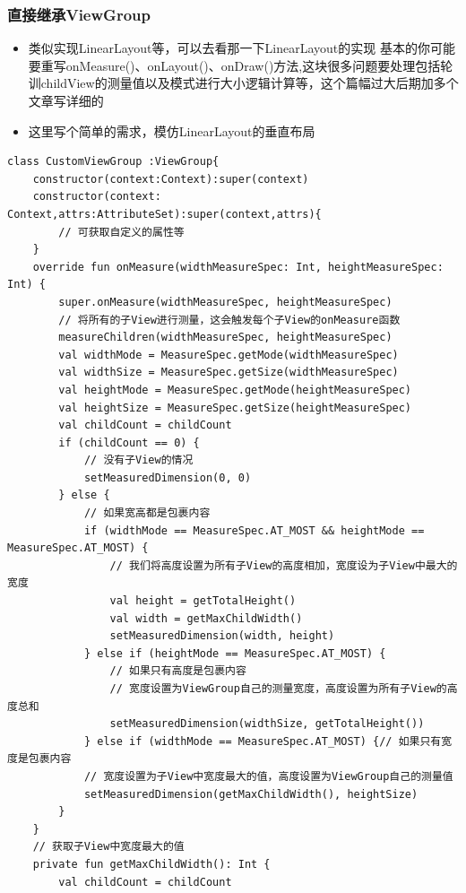 \documentclass[9pt, b5paper]{article}
\begin{document}
\subsubsection{直接继承ViewGroup}
\label{sec-1-3-4}
\begin{itemize}
\item 类似实现LinearLayout等，可以去看那一下LinearLayout的实现 基本的你可能要重写onMeasure()、onLayout()、onDraw()方法,这块很多问题要处理包括轮训childView的测量值以及模式进行大小逻辑计算等，这个篇幅过大后期加多个文章写详细的
\item 这里写个简单的需求，模仿LinearLayout的垂直布局
\end{itemize}
\begin{verbatim}
class CustomViewGroup :ViewGroup{
    constructor(context:Context):super(context)
    constructor(context: Context,attrs:AttributeSet):super(context,attrs){
        // 可获取自定义的属性等
    }
    override fun onMeasure(widthMeasureSpec: Int, heightMeasureSpec: Int) {
        super.onMeasure(widthMeasureSpec, heightMeasureSpec)
        // 将所有的子View进行测量，这会触发每个子View的onMeasure函数
        measureChildren(widthMeasureSpec, heightMeasureSpec)
        val widthMode = MeasureSpec.getMode(widthMeasureSpec)
        val widthSize = MeasureSpec.getSize(widthMeasureSpec)
        val heightMode = MeasureSpec.getMode(heightMeasureSpec)
        val heightSize = MeasureSpec.getSize(heightMeasureSpec)
        val childCount = childCount
        if (childCount == 0) {
            // 没有子View的情况
            setMeasuredDimension(0, 0)
        } else {
            // 如果宽高都是包裹内容
            if (widthMode == MeasureSpec.AT_MOST && heightMode == MeasureSpec.AT_MOST) {
                // 我们将高度设置为所有子View的高度相加，宽度设为子View中最大的宽度
                val height = getTotalHeight()
                val width = getMaxChildWidth()
                setMeasuredDimension(width, height)
            } else if (heightMode == MeasureSpec.AT_MOST) {
                // 如果只有高度是包裹内容
                // 宽度设置为ViewGroup自己的测量宽度，高度设置为所有子View的高度总和
                setMeasuredDimension(widthSize, getTotalHeight())
            } else if (widthMode == MeasureSpec.AT_MOST) {// 如果只有宽度是包裹内容
            // 宽度设置为子View中宽度最大的值，高度设置为ViewGroup自己的测量值
            setMeasuredDimension(getMaxChildWidth(), heightSize)
        }
    }
    // 获取子View中宽度最大的值
    private fun getMaxChildWidth(): Int {
        val childCount = childCount

\end{verbatim}
\end{document}
